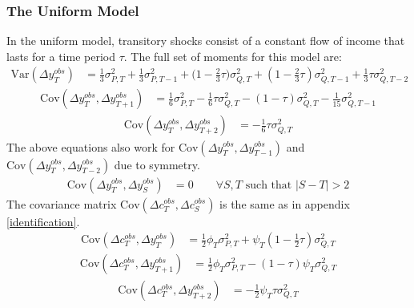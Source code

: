 \subsubsection{The Uniform Model}
In the uniform model, transitory shocks consist of a constant flow of income that lasts for a time period $\tau$. The full set of moments for this model are:
\begin{align*}
\mathrm{Var}(\Delta y^{obs}_T) &= \frac{1}{3}\sigma^2_{P,T} + \frac{1}{3}\sigma^2_{P,T-1} + \big(1-\frac{2}{3}\tau\big) \sigma^2_{Q,T}   +(1-\frac{2}{3}\tau) \sigma^2_{Q,T-1} + \frac{1}{3} \tau\sigma^2_{Q,T-2}
\end{align*}
\begin{align*}
\mathrm{Cov}(\Delta y^{obs}_T, \Delta y^{obs}_{T+1}) &= \frac{1}{6}\sigma^2_{P,T}  -\frac{1}{6}\tau \sigma^2_{Q,T}  -(1-\tau) \sigma^2_{Q,T}  -\frac{1}{15} \sigma^2_{Q,T-1}
\end{align*}
\begin{align*}
\mathrm{Cov}(\Delta y^{obs}_T, \Delta y^{obs}_{T+2})&= -\frac{1}{6}\tau \sigma^2_{Q,T}
\end{align*}
The above equations also work for $\mathrm{Cov}(\Delta y^{obs}_T, \Delta y^{obs}_{T-1})$ and $\mathrm{Cov}(\Delta y^{obs}_T, \Delta y^{obs}_{T-2})$ due to symmetry.
\begin{align*}
\mathrm{Cov}(\Delta y^{obs}_T, \Delta y^{obs}_{S}) &= 0 \qquad \forall S,T \text{ such that }|S-T| >2 
\end{align*}
The covariance matrix $\mathrm{Cov}(\Delta c^{obs}_T, \Delta c^{obs}_{S})$ is the same as in appendix \ref{identification}.
\begin{align*}
\mathrm{Cov}(\Delta c^{obs}_T, \Delta y^{obs}_T) &= \frac{1}{2} \phi_T \sigma^2_{P,T} + \psi_T  (1-\frac{1}{2}\tau )\sigma^2_{Q,T} 
\end{align*}
\begin{align*}
\mathrm{Cov}(\Delta c^{obs}_T, \Delta y^{obs}_{T+1})&= \frac{1}{2} \phi_T \sigma^2_{P,T} - (1-\tau) \psi_T \sigma^2_{Q,T} 
\end{align*}
\begin{align*}
\mathrm{Cov}(\Delta c^{obs}_T, \Delta y^{obs}_{T+2}) &= -\frac{1}{2}\psi_T  \tau \sigma^2_{Q,T}
\end{align*}

